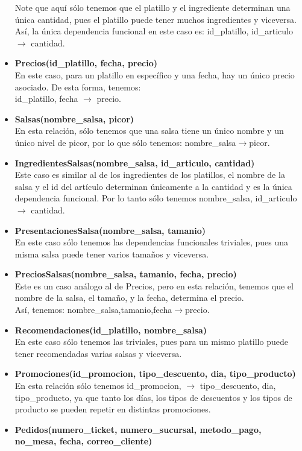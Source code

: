 \documentclass[11pt]{article}
\begin{document}
\begin{itemize}
Note que aquí sólo tenemos que el platillo y el ingrediente determinan una única cantidad, pues el platillo puede tener muchos ingredientes y viceversa. Así, la única dependencia funcional en este caso es: id\_platillo, id\_articulo $\rightarrow$ cantidad.
\item \textbf{Precios(id\_platillo, fecha, precio)}\\
En este caso, para un platillo en específico y una fecha, hay un único precio asociado. De esta forma, tenemos:\\
id\_platillo, fecha $\rightarrow$ precio. 
\item \textbf{Salsas(nombre\_salsa, picor)}\\
En esta relación, sólo tenemos que una salsa tiene un único nombre y un único nivel de picor, por lo que sólo tenemos: nombre\_salsa$\rightarrow$picor.
\item \textbf{IngredientesSalsas(nombre\_salsa, id\_articulo, cantidad)}\\
Este caso es similar al de los ingredientes de los platillos, el nombre de la salsa y el id del artículo determinan únicamente a la cantidad y es la única dependencia funcional. Por lo tanto sólo tenemos nombre\_salsa, id\_articulo $\rightarrow$ cantidad. 
\item \textbf{PresentacionesSalsa(nombre\_salsa, tamanio)}\\
En este caso sólo tenemos las dependencias funcionales triviales, pues una misma salsa puede tener varios tamaños y viceversa.
\item \textbf{PreciosSalsas(nombre\_salsa, tamanio, fecha, precio)}\\
Este es un caso análogo al de Precios, pero en esta relación, tenemos que el nombre de la salsa, el tamaño, y la fecha, determina el precio.\\
Así, tenemos: nombre\_salsa,tamanio,fecha$\rightarrow$precio.
\item \textbf{Recomendaciones(id\_platillo, nombre\_salsa)}\\
En este caso sólo tenemos las triviales, pues para un mismo platillo puede tener recomendadas varias salsas y viceversa.
\item \textbf{Promociones(id\_promocion, tipo\_descuento, dia, tipo\_producto)}\\
En esta relación sólo tenemos id\_promocion, $\rightarrow$ tipo\_descuento, dia, tipo\_producto, ya que tanto los días, los tipos de descuentos y los tipos de producto se pueden repetir en distintas promociones.
\item \textbf{Pedidos(numero\_ticket, numero\_sucursal, metodo\_pago, no\_mesa, fecha, correo\_cliente)}\\

\end{itemize}
\end{document}
